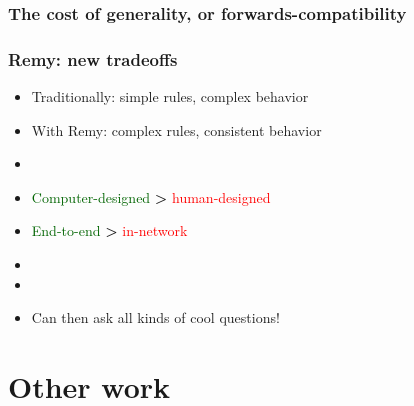 \documentclass[svgnames]{beamer}
\begin{document}
\begin{frame}
\frametitle{The cost of generality, or forwards-compatibility}

\begin{centering}

\noindent {}

\end{centering}

\end{frame}

\begin{frame}
\frametitle{Remy: new tradeoffs}

\large

\begin{itemize}

\item Traditionally: simple rules, complex behavior

\item With Remy: complex rules, consistent behavior

\item[]

\item \textcolor{DarkGreen}{Computer-designed} {\LARGE \textbf{\textgreater}} \textcolor{Red}{human-designed}

\item \textcolor{DarkGreen}{End-to-end} {\LARGE \textbf{\textgreater}} \textcolor{Red}{in-network}

\item[]

\item {}

\item Can then ask all kinds of cool questions!

\end{itemize}

\end{frame}

%
%
%
%
%
%
%
%
%
%

\section{Other work}

\end{document}
